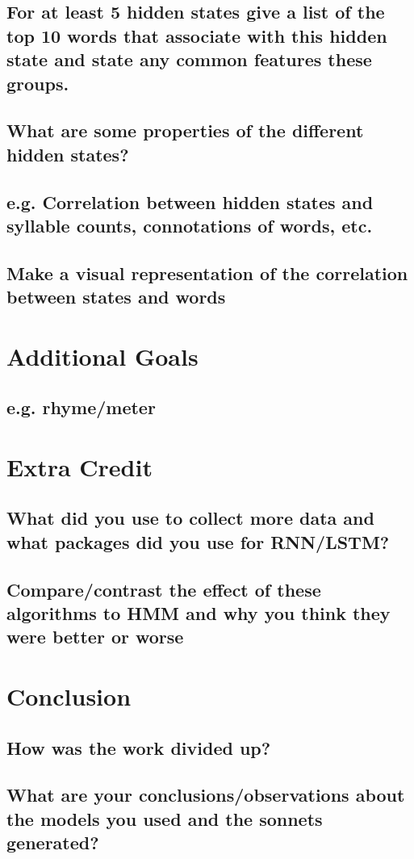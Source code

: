 \subsection{For at least 5 hidden states give a list of the top 10 words that associate with this hidden state and
state any common features these groups.}
\subsection{What are some properties of the different hidden states?}
\subsection{e.g. Correlation between hidden states and syllable counts, connotations of words, etc.}
\subsection{Make a visual representation of the correlation between states and words}


\section{Additional Goals}
\medskip

\subsection{e.g. rhyme/meter}


\section{Extra Credit}
\medskip

\subsection{What did you use to collect more data and what packages did you use for RNN/LSTM?}
\subsection{Compare/contrast the effect of these algorithms to HMM and why you think they were better or worse}


\section{Conclusion}
\medskip

\subsection{How was the work divided up?}
\subsection{What are your conclusions/observations about the models you used and the sonnets generated?}



